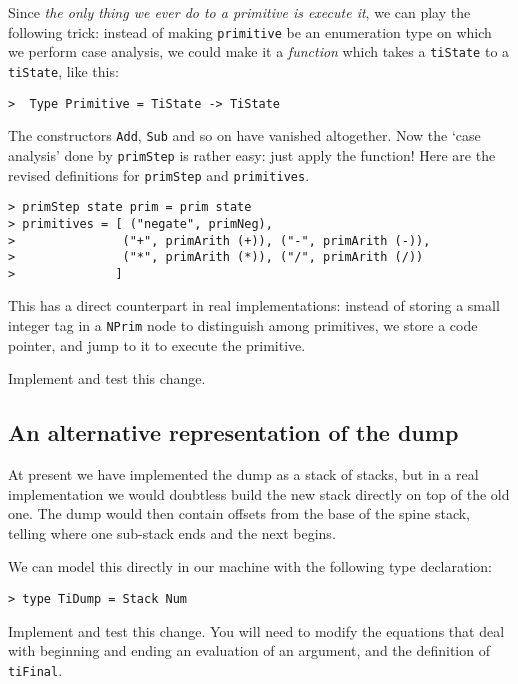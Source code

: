 Since {\em the only thing we ever
do to a primitive is execute it}, we
can play the following trick: instead of making \mbox{\tt primitive} be
an enumeration type on which we perform case analysis, we could
make it a {\em function\/} which takes a \mbox{\tt tiState} to a \mbox{\tt tiState}, like this:
\begin{verbatim}
>  Type Primitive = TiState -> TiState
\end{verbatim}
The constructors \mbox{\tt Add}, \mbox{\tt Sub} and so on have vanished altogether.
Now the `case analysis' done by \mbox{\tt primStep} is rather easy:
just apply the function!
Here are the revised definitions for \mbox{\tt primStep} and \mbox{\tt primitives}.
\begin{verbatim}
> primStep state prim = prim state
> primitives = [ ("negate", primNeg),
>               ("+", primArith (+)), ("-", primArith (-)),
>               ("*", primArith (*)), ("/", primArith (/))
>              ]
\end{verbatim}
%
%
This has a direct counterpart in real implementations: instead of
storing a small integer tag in a \mbox{\tt NPrim} node to distinguish among
primitives, we store a code pointer, and jump to it to execute the
primitive.

\begin{exercise}
Implement and test this change.
\end{exercise}

\subsection{An alternative representation of the dump}

At present we have implemented the dump as a stack of stacks, but in
a real implementation we would doubtless build the new stack directly
on top of the old one.  The dump would then contain offsets from the
base of the
spine stack, telling where one sub-stack ends and the next begins.

We can model this directly in our machine with the following type
declaration:
\begin{verbatim}
> type TiDump = Stack Num
\end{verbatim}
%
\begin{exercise}
Implement and test this change.  You will need to modify the equations
that deal with beginning and ending an evaluation of an argument,
and the definition of \mbox{\tt tiFinal}.
\end{exercise}

